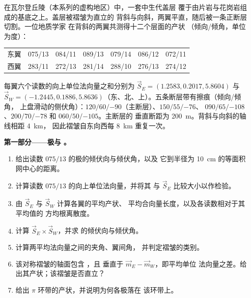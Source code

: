 \begin{problem}
\label{pb:b3:structural-analysis:1}
在瓦尔登丘陵（本系列的虚构地区）中，一套中生代盖层
覆于由片岩与花岗岩组成的基底之上。盖层被褶皱为直立的
背斜与向斜，两翼平直，随后被一条正断层切割。一位地质学家
在背斜的两翼共测得十二个层面的产状
（倾向/倾角，单位为度）：

\begin{center}
\small
\begin{tabular}{l|cccccc}
\hline
东翼 & 075/13 & 084/11 & 089/13 & 079/14 & 086/12 & 072/11 \\
西翼 & 283/11 & 272/13 & 281/14 & 288/10 & 276/13 & 274/12 \\
\hline
\end{tabular}
\end{center}

每翼六个读数的向上单位法向量之和分别为
$\vec S_E = (1.2583, 0.2017, 5.8604)$ 与 $\vec S_W = (-1.2445, 0.1886,
5.8636)$（东、北、上）。五条断层带有擦痕（倾向/倾角，
上盘滑动的侧伏角）：$120/60/{-90}$（主断层）、$150/55/{-76}$、
$090/65/{-108}$、$200/70/{-78}$ 和 $060/50/{-105}$。主断层的
垂直断距为 \qty{200}{m}。背斜与向斜的轴线相距 \qty{4}{km}，
因此褶皱自东向西每 \qty{8}{km} 重复一次。

\medskip\noindent\textbf{第一部分——极与 。}
\begin{enumerate}
  \item 给出读数 $075/13$ 的极的倾伏向与倾伏角，以及
        它到半径为
        \qty{10}{cm} 的等面积网中心的距离。
  \item 计算读数 $075/13$ 的向上单位法向量，并将其
        与 $\vec S_E$ 比较大小以作检验。
  \item 由 $\vec S_E$ 与 $\vec S_W$ 计算各翼的平均产状、
        平均合向量长度，以及各读数相对于其平均值的
        方均根离散度。
  \item 计算 $\vec S_E\times\vec S_W$，并求
        的倾伏向与倾伏角。
  \item 计算两平均法向量之间的夹角、翼间角，
        并判定褶皱的类别。
  \item 该对称褶皱的轴面包含 ，且
        垂直于 $\vec m_E - \vec m_W$，即平均单位
        法向量之差。给出其产状；该褶皱是否直立？
  \item 给出 $\pi$ 环带的产状，并说明为何各极落在
        该环带上。
\end{enumerate}


\end{problem}
